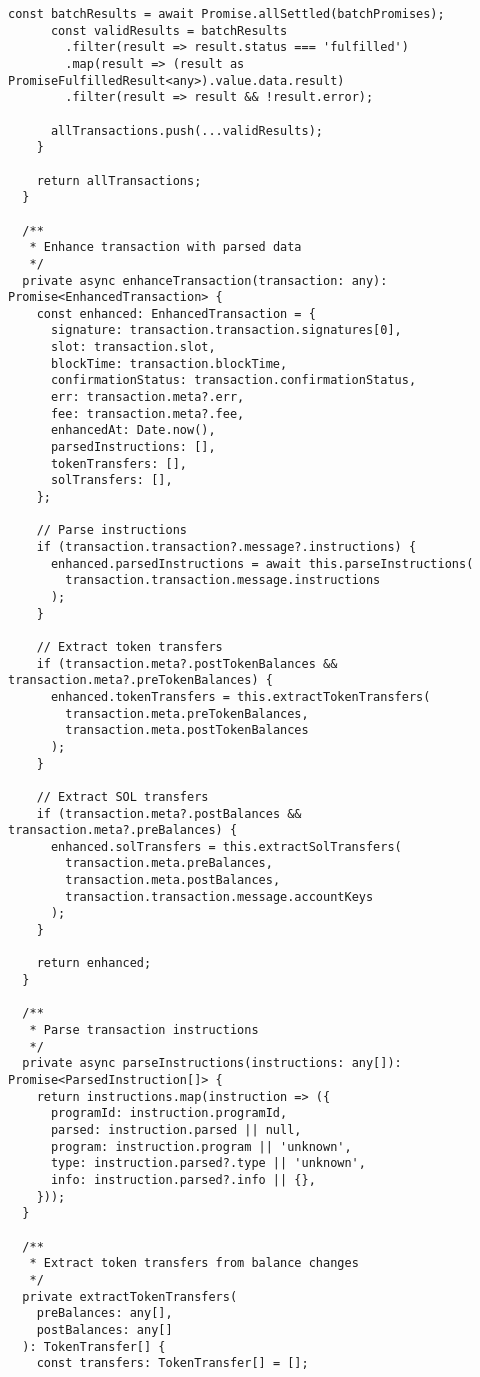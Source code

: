 \documentclass[11pt,a4paper]{article}
\begin{document}
\begin{lstlisting}[style=typescript, caption=Helius RPC Service with Advanced Features]
      const batchResults = await Promise.allSettled(batchPromises);
      const validResults = batchResults
        .filter(result => result.status === 'fulfilled')
        .map(result => (result as PromiseFulfilledResult<any>).value.data.result)
        .filter(result => result && !result.error);

      allTransactions.push(...validResults);
    }

    return allTransactions;
  }

  /**
   * Enhance transaction with parsed data
   */
  private async enhanceTransaction(transaction: any): Promise<EnhancedTransaction> {
    const enhanced: EnhancedTransaction = {
      signature: transaction.transaction.signatures[0],
      slot: transaction.slot,
      blockTime: transaction.blockTime,
      confirmationStatus: transaction.confirmationStatus,
      err: transaction.meta?.err,
      fee: transaction.meta?.fee,
      enhancedAt: Date.now(),
      parsedInstructions: [],
      tokenTransfers: [],
      solTransfers: [],
    };

    // Parse instructions
    if (transaction.transaction?.message?.instructions) {
      enhanced.parsedInstructions = await this.parseInstructions(
        transaction.transaction.message.instructions
      );
    }

    // Extract token transfers
    if (transaction.meta?.postTokenBalances && transaction.meta?.preTokenBalances) {
      enhanced.tokenTransfers = this.extractTokenTransfers(
        transaction.meta.preTokenBalances,
        transaction.meta.postTokenBalances
      );
    }

    // Extract SOL transfers
    if (transaction.meta?.postBalances && transaction.meta?.preBalances) {
      enhanced.solTransfers = this.extractSolTransfers(
        transaction.meta.preBalances,
        transaction.meta.postBalances,
        transaction.transaction.message.accountKeys
      );
    }

    return enhanced;
  }

  /**
   * Parse transaction instructions
   */
  private async parseInstructions(instructions: any[]): Promise<ParsedInstruction[]> {
    return instructions.map(instruction => ({
      programId: instruction.programId,
      parsed: instruction.parsed || null,
      program: instruction.program || 'unknown',
      type: instruction.parsed?.type || 'unknown',
      info: instruction.parsed?.info || {},
    }));
  }

  /**
   * Extract token transfers from balance changes
   */
  private extractTokenTransfers(
    preBalances: any[],
    postBalances: any[]
  ): TokenTransfer[] {
    const transfers: TokenTransfer[] = [];


\end{lstlisting}
\end{document}
